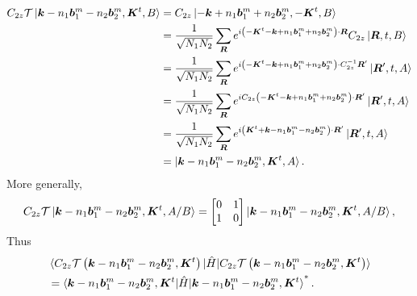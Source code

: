 \documentclass[10pt, oneside]{article}
\newcommand{\p}[1]{\left(#1\right)}
\begin{document}
\begin{align}
	\begin{split}
		C_{2z} \mathcal{T}\ket{\bm{k} -n_{1} \bm{b}^{m}_{1} - n_{2} \bm{b}^{m}_{2}, \bm{K}^{t}, B} & = C_{2z}  \ket{ - \bm{k} + n_{1} \bm{b}^{m}_{1} + n_{2} \bm{b}^{m}_{2}, - \bm{K}^{t}, B} \\
		& = \frac{1}{\sqrt{N_{1} N_{2}}} \sum_{\bm{R}} e^{ i \p{ - \bm{K}^{t} - \bm{k} + n_{1} \bm{b}^{m}_{1} + n_{2} \bm{b}^{m}_{2}} \cdot \bm{R}} C_{2z} \ket{\bm{R}, t, B} \\
		& = \frac{1}{\sqrt{N_{1} N_{2}}} \sum_{\bm{R}} e^{ i \p{ - \bm{K}^{t} - \bm{k} + n_{1} \bm{b}^{m}_{1} + n_{2} \bm{b}^{m}_{2}} \cdot C^{-1}_{2z} \bm{R}^\prime}  \ket{\bm{R}^\prime, t, A} \\
		& =  \frac{1}{\sqrt{N_{1} N_{2}}} \sum_{\bm{R}} e^{ i C_{2z} \p{ - \bm{K}^{t} - \bm{k} + n_{1} \bm{b}^{m}_{1} + n_{2} \bm{b}^{m}_{2}} \cdot \bm{R}^\prime}  \ket{\bm{R}^\prime, t, A} \\
		& =  \frac{1}{\sqrt{N_{1} N_{2}}} \sum_{\bm{R}} e^{ i \p{\bm{K}^{t} + \bm{k} - n_{1} \bm{b}^{m}_{1} - n_{2} \bm{b}^{m}_{2}} \cdot \bm{R}^\prime}  \ket{\bm{R}^\prime, t, A} \\
		& = \ket{\bm{k} -n_{1} \bm{b}^{m}_{1} - n_{2} \bm{b}^{m}_{2}, \bm{K}^{t}, A}.
	\end{split}
\end{align}
More generally, 
\begin{align}
	C_{2z} \mathcal{T}\ket{\bm{k} -n_{1} \bm{b}^{m}_{1} - n_{2} \bm{b}^{m}_{2}, \bm{K}^{t}, A/B} = \begin{bmatrix}
		0 & 1 \\
		1 & 0 
	\end{bmatrix} \ket{\bm{k} -n_{1} \bm{b}^{m}_{1} - n_{2} \bm{b}^{m}_{2}, \bm{K}^{t}, A/B},
\end{align}
Thus  
\begin{align}
	\begin{split}
		&\braket{C_{2z} \mathcal{T} \p{\bm{k} -n_{1} \bm{b}^{m}_{1} - n_{2} \bm{b}^{m}_{2}, \bm{K}^{t}} | \hat{H} | C_{2z} \mathcal{T} \p{\bm{k} -n_{1} \bm{b}^{m}_{1} - n_{2} \bm{b}^{m}_{2}, \bm{K}^{t}}} \\
		&= \braket{\bm{k} -n_{1} \bm{b}^{m}_{1} - n_{2} \bm{b}^{m}_{2}, \bm{K}^{t} | \hat{H} | \bm{k} -n_{1} \bm{b}^{m}_{1} - n_{2} \bm{b}^{m}_{2}, \bm{K}^{t}}^{*}.
	\end{split}
\end{align}
\end{document}
